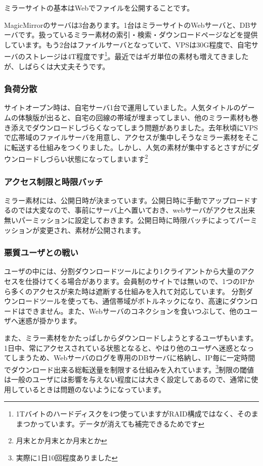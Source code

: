 ミラーサイトの基本はWebでファイルを公開することです。

MagicMirrorのサーバは3台あります。1台はミラーサイトのWebサーバと、DBサーバです。扱っているミラー素材の索引・検索・ダウンロードページなどを提供しています。もう2台はファイルサーバとなっていて、VPSは30G程度で、自宅サーバのストレージは4T程度です\footnote{1Tバイトのハードディスクを4つ使っていますがRAID構成ではなく、そのままつかっています。データが消えても補完できるためです}。最近ではギガ単位の素材も増えてきましたが、しばらくは大丈夫そうです。

\subsubsection{負荷分散}
サイトオープン時は、自宅サーバ1台で運用していました。人気タイトルのゲームの体験版が出ると、自宅の回線の帯域が埋まってしまい、他のミラー素材も巻き添えでダウンロードしづらくなってしまう問題がありました。去年秋頃にVPSで広帯域のファイルサーバを用意し、アクセスが集中しそうなミラー素材をそこに転送する仕組みをつくりました。しかし、人気の素材が集中するとさすがにダウンロードしづらい状態になってしまいます\footnote{月末とか月末とか月末とか}

\subsubsection{アクセス制限と時限バッチ}
ミラー素材には、公開日時が決まっています。公開日時に手動でアップロードするのでは大変なので、事前にサーバ上へ置いておき、webサーバがアクセス出来無いパーミッションに設定しておきます。公開日時に時限バッチによってパーミッションが変更され、素材が公開されます。

\subsubsection{悪質ユーザとの戦い}

ユーザの中には、分割ダウンロードツールにより1クライアントから大量のアクセスを仕掛けてくる場合があります。会員制のサイトでは無いので、1つのIPから多くのアクセスが来た時は遮断する仕組みを入れて対応しています。%
分割ダウンロードツールを使っても、通信帯域がボトルネックになり、高速にダウンロードはできません。また、Webサーバのコネクションを食いつぶして、他のユーザへ迷惑が掛かります。

また、ミラー素材をかたっぱしからダウンロードしようとするユーザもいます。1日中、常にアクセスされている状態となると、やはり他のユーザへ迷惑となってしまうため、Webサーバのログを専用のDBサーバに格納し、IP毎に一定時間でダウンロード出来る総転送量を制限する仕組みを入れています。\footnote{実際に1日10回程度ありました}制限の閾値は一般のユーザには影響を与えない程度には大きく設定してあるので、通常に使用しているときは問題のないようになっています。

